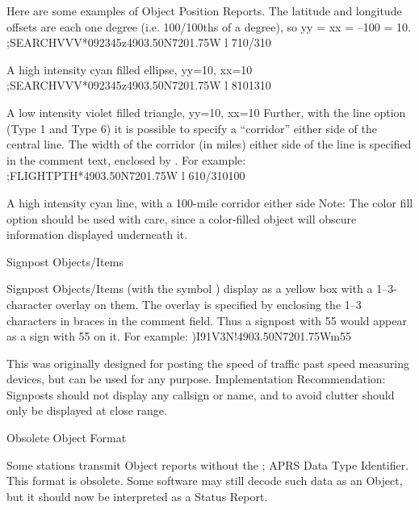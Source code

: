 Here are some examples of Object Position Reports. The latitude and
longitude offsets are each one degree (i.e. 100/100ths of a degree), so
yy = xx = –100 = 10.
;SEARCHVVV*092345z4903.50N\07201.75W l 710/310

A high intensity cyan filled ellipse, yy=10, xx=10
;SEARCHVVV*092345z4903.50N\07201.75W l 8101310

A low intensity violet filled triangle, yy=10, xx=10
Further, with the line option (Type 1 and Type 6) it is possible to specify a
“corridor” either side of the central line. The width of the corridor (in miles)
either side of the line is specified in the comment text, enclosed by {}.
For example:
;FLIGHTPTH*4903.50N\07201.75W l 610/310{100}

A high intensity cyan line, with a 100-mile corridor
either side
Note: The color fill option should be used with care, since a color-filled
object will obscure information displayed underneath it.

Signpost
Objects/Items

Signpost Objects/Items (with the symbol \m) display as a yellow box with a
1–3-character overlay on them. The overlay is specified by enclosing the 1–3
characters in braces in the comment field. Thus a signpost with {55} would
appear as a sign with 55 on it.
For example:
)I91V3N!4903.50N\07201.75Wm{55}

This was originally designed for posting the speed of traffic past speed
measuring devices, but can be used for any purpose.
Implementation Recommendation: Signposts should not display any callsign
or name, and to avoid clutter should only be displayed at close range.

Obsolete Object
Format

Some stations transmit Object reports without the ; APRS Data Type
Identifier. This format is obsolete. Some software may still decode such data
as an Object, but it should now be interpreted as a Status Report.
